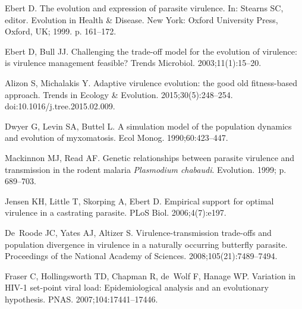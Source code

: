 \documentclass[10pt,letterpaper]{article}
\begin{document}
\nolinenumbers

%
%
% 

% 
\begin{thebibliography}{10}

Ebert D.
\newblock The evolution and expression of parasite virulence.
\newblock In: Stearns SC, editor. Evolution in Health \& Disease. New York:
  Oxford University Press, Oxford, UK; 1999. p. 161--172.

Ebert D, Bull JJ.
\newblock Challenging the trade-off model for the evolution of virulence: is
  virulence management feasible?
\newblock Trends Microbiol. 2003;11(1):15--20.

Alizon S, Michalakis Y.
\newblock Adaptive virulence evolution: the good old fitness-based approach.
\newblock Trends in Ecology \& Evolution. 2015;30(5):248--254.
\newblock doi:{10.1016/j.tree.2015.02.009}.

Dwyer G, Levin SA, Buttel L.
\newblock A simulation model of the population dynamics and evolution of
  myxomatosis.
\newblock Ecol Monog. 1990;60:423--447.

Mackinnon MJ, Read AF.
\newblock Genetic relationships between parasite virulence and transmission in
  the rodent malaria {{\em Plasmodium chabaudi}}.
\newblock Evolution. 1999; p. 689--703.

Jensen KH, Little T, Skorping A, Ebert D.
\newblock Empirical support for optimal virulence in a castrating parasite.
\newblock PLoS Biol. 2006;4(7):e197.

De~Roode JC, Yates AJ, Altizer S.
\newblock Virulence-transmission trade-offs and population divergence in
  virulence in a naturally occurring butterfly parasite.
\newblock Proceedings of the National Academy of Sciences.
  2008;105(21):7489--7494.

Fraser C, Hollingsworth TD, Chapman R, de~Wolf F, Hanage WP.
\newblock Variation in {HIV}-1 set-point viral load: Epidemiological analysis
  and an evolutionary hypothesis.
\newblock PNAS. 2007;104:17441--17446.


\end{thebibliography}
\end{document}
